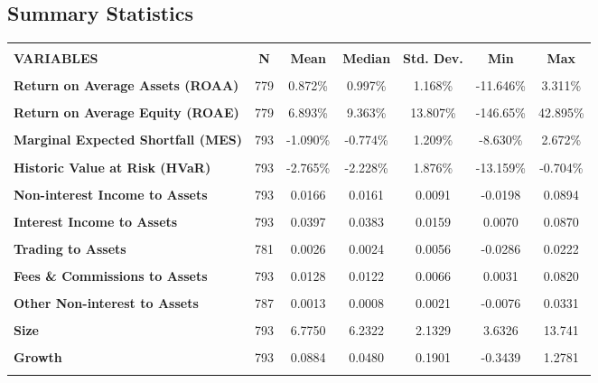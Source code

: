 \documentclass[10pt]{article} %
\begin{document}
\subsection{Summary Statistics}
\thispagestyle{plain}
\begin{table}[H]
\label{This is a label}
\resizebox{\textwidth}{!} {
\begin{tabular}{lcccccc} \\ \hline
 &  &  &  &  &  \\
\textbf{VARIABLES} & \textbf{N} & \textbf{Mean} & \textbf{Median} & \textbf{Std. Dev.} & \textbf{Min} & \textbf{Max} \\ \hline\hline
 &  &  &  &  &  \\
 \textbf{Return on Average Assets (ROAA)} & 779 & 0.872\% & 0.997\% & 1.168\% & -11.646\% & 3.311\% \\\\
  \textbf{Return on Average Equity (ROAE)} & 779 & 6.893\% & 9.363\% & 13.807\% & -146.65\% & 42.895\% \\\\
\textbf{Marginal Expected Shortfall (MES)} & 793 & -1.090\% & -0.774\% & 1.209\% & -8.630\% & 2.672\% \\\\
\textbf{Historic Value at Risk (HVaR)} & 793 & -2.765\% & -2.228\% & 1.876\% & -13.159\% & -0.704\% \\\\
\textbf{Non-interest Income to Assets} & 793 & 0.0166 & 0.0161 & 0.0091 & -0.0198 & 0.0894 \\\\
\textbf{Interest Income to Assets} & 793 & 0.0397 & 0.0383 & 0.0159 & 0.0070 & 0.0870 \\\\
\textbf{Trading to Assets} & 781 & 0.0026 & 0.0024 & 0.0056 & -0.0286 & 0.0222 \\\\
\textbf{Fees \& Commissions to Assets} & 793 & 0.0128 & 0.0122 & 0.0066 & 0.0031 & 0.0820 \\\\
\textbf{Other Non-interest to Assets} & 787 & 0.0013 & 0.0008 & 0.0021 & -0.0076 & 0.0331 \\\\
\textbf{Size} & 793 & 6.7750 & 6.2322 & 2.1329 & 3.6326 & 13.741 \\\\
\textbf{Growth} & 793 & 0.0884 & 0.0480 & 0.1901 & -0.3439 & 1.2781 \\\\

\end{tabular}}
\end{table}
\end{document}
